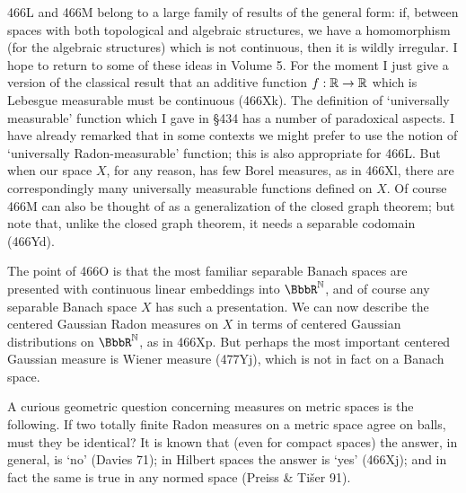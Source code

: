 {466L and 466M belong to a large family of results of the general form:
if, between spaces with both topological and algebraic structures, we
have a homomorphism (for the algebraic structures) which is not
continuous, then it is wildly irregular.   I hope to return to some of
these ideas in Volume 5.   For the moment I just give a version of the
classical result that an additive function $f:\Bbb R\to\Bbb R$ which is
Lebesgue measurable must be continuous (466Xk).   The definition of
`universally measurable' function which I gave in \S434 has a number of
paradoxical aspects.   I have already remarked that in some contexts we
might prefer to use the notion of `universally
Radon-measurable' function;  this is also appropriate for 466L.   But
when our space $X$, for any reason, has few Borel
measures, as in 466Xl, there are correspondingly many universally
measurable functions defined on $X$.   Of course 466M can also be
thought of as a generalization of the closed graph theorem;  but note
that, unlike the closed graph theorem, it needs a separable codomain
(466Yd).

The point of 466O is that the most familiar separable Banach spaces are
presented with continuous linear embeddings into $\BbbR^{\Bbb N}$, and of
course any separable Banach space $X$ has such a presentation.   We can now
describe the centered Gaussian Radon measures on $X$ in terms of
centered Gaussian distributions on $\BbbR^{\Bbb N}$, as in 466Xp.   But
perhaps the most important centered Gaussian measure is Wiener measure
(477Yj), which is not in fact on a Banach space.

A curious geometric question concerning measures on metric spaces is the
following.   If two totally finite Radon measures on a metric space
agree on balls, must they be identical?   It is known that (even for
compact spaces) the answer, in general, is `no' ({\smc Davies 71});
in Hilbert spaces the answer is `yes' (466Xj);   and in fact the same is
true in any normed space ({\smc Preiss \& Ti\v{s}er 91}).


}%

\discrpage

